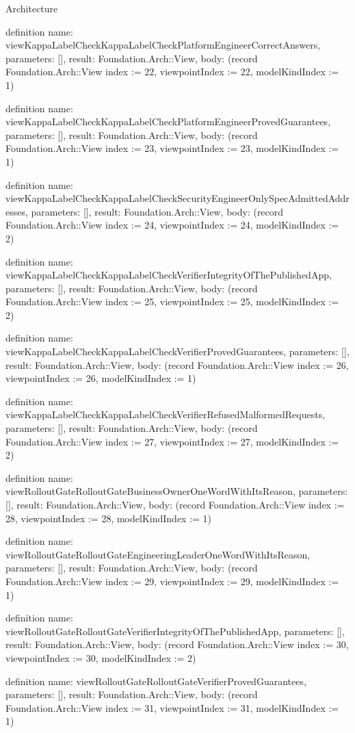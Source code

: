 \begin{lexlean}{Architecture}
\begin{semanticmodule}
definition{
  name: viewKappaLabelCheckKappaLabelCheckPlatformEngineerCorrectAnswers,
  parameters: [],
  result: Foundation.Arch::View,
  body: (record Foundation.Arch::View {index := 22, viewpointIndex := 22, modelKindIndex := 1})
}

definition{
  name: viewKappaLabelCheckKappaLabelCheckPlatformEngineerProvedGuarantees,
  parameters: [],
  result: Foundation.Arch::View,
  body: (record Foundation.Arch::View {index := 23, viewpointIndex := 23, modelKindIndex := 1})
}

definition{
  name: viewKappaLabelCheckKappaLabelCheckSecurityEngineerOnlySpecAdmittedAddresses,
  parameters: [],
  result: Foundation.Arch::View,
  body: (record Foundation.Arch::View {index := 24, viewpointIndex := 24, modelKindIndex := 2})
}

definition{
  name: viewKappaLabelCheckKappaLabelCheckVerifierIntegrityOfThePublishedApp,
  parameters: [],
  result: Foundation.Arch::View,
  body: (record Foundation.Arch::View {index := 25, viewpointIndex := 25, modelKindIndex := 2})
}

definition{
  name: viewKappaLabelCheckKappaLabelCheckVerifierProvedGuarantees,
  parameters: [],
  result: Foundation.Arch::View,
  body: (record Foundation.Arch::View {index := 26, viewpointIndex := 26, modelKindIndex := 1})
}

definition{
  name: viewKappaLabelCheckKappaLabelCheckVerifierRefusedMalformedRequests,
  parameters: [],
  result: Foundation.Arch::View,
  body: (record Foundation.Arch::View {index := 27, viewpointIndex := 27, modelKindIndex := 2})
}

definition{
  name: viewRolloutGateRolloutGateBusinessOwnerOneWordWithItsReason,
  parameters: [],
  result: Foundation.Arch::View,
  body: (record Foundation.Arch::View {index := 28, viewpointIndex := 28, modelKindIndex := 1})
}

definition{
  name: viewRolloutGateRolloutGateEngineeringLeaderOneWordWithItsReason,
  parameters: [],
  result: Foundation.Arch::View,
  body: (record Foundation.Arch::View {index := 29, viewpointIndex := 29, modelKindIndex := 1})
}

definition{
  name: viewRolloutGateRolloutGateVerifierIntegrityOfThePublishedApp,
  parameters: [],
  result: Foundation.Arch::View,
  body: (record Foundation.Arch::View {index := 30, viewpointIndex := 30, modelKindIndex := 2})
}

definition{
  name: viewRolloutGateRolloutGateVerifierProvedGuarantees,
  parameters: [],
  result: Foundation.Arch::View,
  body: (record Foundation.Arch::View {index := 31, viewpointIndex := 31, modelKindIndex := 1})
}


\end{semanticmodule}
\end{lexlean}
